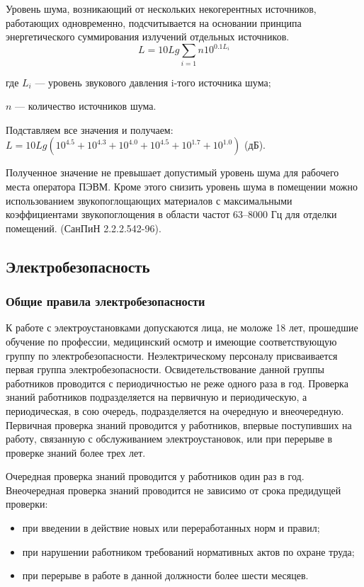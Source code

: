 Уровень шума, возникающий от нескольких некогерентных источников, работающих одновременно,
подсчитывается на основании принципа энергетического суммирования излучений отдельных источников.
\begin{equation}
L = 10 Lg\sum_{i=1}{n} 10^{0.1L_i}
\end{equation}
\begin{ESKDexplanation}
	\item[где ]{} $L_i$ --- уровень звукового давления i-того источника шума;
	\item{} $n$ --- количество источников шума.
\end{ESKDexplanation}
Подставляем все значения и получаем: $L = 10Lg (10^{4.5} + 10^{4.3} + 10^{4.0} + 10^{4.5} + 10^{1.7} + 10^{1.0})$ (дБ).

Полученное значение не превышает допустимый уровень шума для рабочего места оператора ПЭВМ.
Кроме этого снизить уровень шума в помещении  можно использованием звукопоглощающих материалов
с максимальными коэффициентами звукопоглощения в области частот 63--8000 Гц
для отделки помещений. (СанПиН 2.2.2.542-96).

\subsection{Электробезопасность}
\subsubsection{Общие правила электробезопасности}
К работе с электроустановками допускаются лица, не моложе 18 лет, прошедшие обучение по
профессии, медицинский осмотр и имеющие соответствующую группу по электробезопасности.
Неэлектрическому персоналу присваивается первая группа электробезопасности.
Освидетельствование данной группы работников проводится с периодичностью не реже одного раза в год.
Проверка знаний работников подразделяется на первичную и периодическую, а периодическая,
в сою очередь, подразделяется на очередную и внеочередную. Первичная
проверка знаний  проводится у работников, впервые поступивших на работу,
связанную с обслуживанием электроустановок, или при перерыве в проверке
знаний более трех лет.


Очередная проверка знаний проводится у работников один раз в год.
Внеочередная проверка знаний  проводится не зависимо от срока предидущей
проверки:
\begin{itemize}
	\item{} при введении в действие новых или переработанных норм и правил;
	\item{} при нарушении работником требований нормативных актов по охране труда;
	\item{} при перерыве в работе в данной должности более шести месяцев.
\end{itemize}

